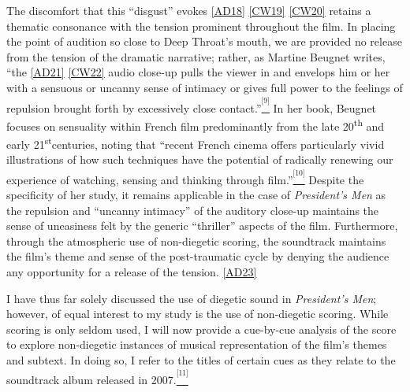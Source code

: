 The discomfort that this “disgust” evokes \href{applewebdata://3A1D666A-D52A-46D2-8C90-343A1EE58F85\#_msocom_18}{[AD18]} \href{applewebdata://3A1D666A-D52A-46D2-8C90-343A1EE58F85\#_msocom_19}{[CW19]} \href{applewebdata://3A1D666A-D52A-46D2-8C90-343A1EE58F85\#_msocom_20}{[CW20]} retains a thematic consonance with the tension prominent throughout the film.
In placing the point of audition so close to Deep Throat’s mouth, we are provided no release from the tension of the dramatic narrative;
rather, as Martine Beugnet writes, “the \href{applewebdata://3A1D666A-D52A-46D2-8C90-343A1EE58F85\#_msocom_21}{[AD21]} \href{applewebdata://3A1D666A-D52A-46D2-8C90-343A1EE58F85\#_msocom_22}{[CW22]} audio close-up pulls the viewer in and envelops him or her with a sensuous or uncanny sense of intimacy or gives full power to the feelings of repulsion brought forth by excessively close contact.”\href{applewebdata://3A1D666A-D52A-46D2-8C90-343A1EE58F85\#_ftn9}{\textsuperscript{\textsuperscript{[9]}}}
In her book, Beugnet focuses on sensuality within French film predominantly from the late 20\textsuperscript{th} and early 21\textsuperscript{st}centuries, noting that “recent French cinema offers particularly vivid illustrations of how such techniques have the potential of radically renewing our experience of watching, sensing and thinking through film.”\href{applewebdata://3A1D666A-D52A-46D2-8C90-343A1EE58F85\#_ftn10}{\textsuperscript{\textsuperscript{[10]}}}
Despite the specificity of her study, it remains applicable in the case of \textit{President’s Men} as the repulsion and “uncanny intimacy” of the auditory close-up maintains the sense of uneasiness felt by the generic “thriller” aspects of the film.
Furthermore, through the atmospheric use of non-diegetic scoring, the soundtrack maintains the film’s theme and sense of the post-traumatic cycle by denying the audience any opportunity for a release of the tension. \href{applewebdata://3A1D666A-D52A-46D2-8C90-343A1EE58F85\#_msocom_23}{[AD23]} 

I have thus far solely discussed the use of diegetic sound in \textit{President’s Men}; however, of equal interest to my study is the use of non-diegetic scoring.
While scoring is only seldom used, I will now provide a cue-by-cue analysis of the score to explore non-diegetic instances of musical representation of the film’s themes and subtext.
In doing so, I refer to the titles of certain cues as they relate to the soundtrack album released in 2007.\href{applewebdata://3A1D666A-D52A-46D2-8C90-343A1EE58F85\#_ftn11}{\textsuperscript{\textsuperscript{[11]}}}

